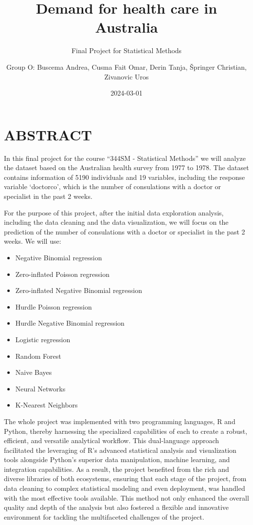 \documentclass[
]{article}
\title{Demand for health care in Australia}
\subtitle{Final Project for Statistical Methods}
\author{Group O: Buscema Andrea, Cusma Fait Omar, Derin Tanja, Špringer
Christian, Zivanovic Uros}
\date{2024-03-01}
\providecommand{\tightlist}{%
  \setlength{\itemsep}{0pt}\setlength{\parskip}{0pt}}
\begin{document}
\maketitle

{
\setcounter{tocdepth}{3}
\tableofcontents
}
\section{ABSTRACT}\label{abstract}

In this final project for the course ``344SM - Statistical Methods'' we
will analyze the dataset based on the Australian health survey from 1977
to 1978. The dataset contains information of 5190 individuals and 19
variables, including the response variable `doctorco', which is the
number of consulations with a doctor or specialist in the past 2 weeks.

For the purpose of this project, after the initial data exploration
analysis, including the data cleaning and the data visualization, we
will focus on the prediction of the number of consulations with a doctor
or specialist in the past 2 weeks. We will use:

\begin{itemize}
\tightlist
\item
  Negative Binomial regression
\item
  Zero-inflated Poisson regression
\item
  Zero-inflated Negative Binomial regression
\item
  Hurdle Poisson regression
\item
  Hurdle Negative Binomial regression
\item
  Logistic regression
\item
  Random Forest
\item
  Naive Bayes
\item
  Neural Networks
\item
  K-Nearest Neighbors
\end{itemize}

The whole project was implemented with two programming languages, R and
Python, thereby harnessing the specialized capabilities of each to
create a robust, efficient, and versatile analytical workflow. This
dual-language approach facilitated the leveraging of R's advanced
statistical analysis and visualization tools alongside Python's superior
data manipulation, machine learning, and integration capabilities. As a
result, the project benefited from the rich and diverse libraries of
both ecosystems, ensuring that each stage of the project, from data
cleaning to complex statistical modeling and even deployment, was
handled with the most effective tools available. This method not only
enhanced the overall quality and depth of the analysis but also fostered
a flexible and innovative environment for tackling the multifaceted
challenges of the project.
\end{document}
